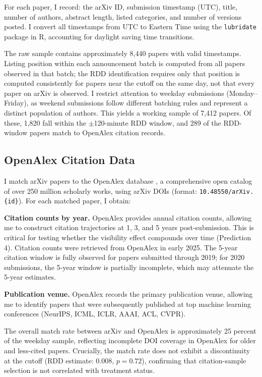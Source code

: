 \documentclass[12pt]{article}
\begin{document}
For each paper, I record: the arXiv ID, submission timestamp (UTC), title, number of authors, abstract length, listed categories, and number of versions posted. I convert all timestamps from UTC to Eastern Time using the \texttt{lubridate} package in R, accounting for daylight saving time transitions.

The raw sample contains approximately 8,440 papers with valid timestamps. Listing position within each announcement batch is computed from all papers observed in that batch; the RDD identification requires only that position is computed consistently for papers near the cutoff on the same day, not that every paper on arXiv is observed. I restrict attention to weekday submissions (Monday--Friday), as weekend submissions follow different batching rules and represent a distinct population of authors. This yields a working sample of 7,412 papers. Of these, 1,820 fall within the $\pm$120-minute RDD window, and 289 of the RDD-window papers match to OpenAlex citation records.

\subsection{OpenAlex Citation Data}

I match arXiv papers to the OpenAlex database \citep{priem2022}, a comprehensive open catalog of over 250 million scholarly works, using arXiv DOIs (format: \texttt{10.48550/arXiv.\{id\}}). For each matched paper, I obtain:

\textbf{Citation counts by year.} OpenAlex provides annual citation counts, allowing me to construct citation trajectories at 1, 3, and 5 years post-submission. This is critical for testing whether the visibility effect compounds over time (Prediction 4). Citation counts were retrieved from OpenAlex in early 2025. The 5-year citation window is fully observed for papers submitted through 2019; for 2020 submissions, the 5-year window is partially incomplete, which may attenuate the 5-year estimates.

\textbf{Publication venue.} OpenAlex records the primary publication venue, allowing me to identify papers that were subsequently published at top machine learning conferences (NeurIPS, ICML, ICLR, AAAI, ACL, CVPR).

The overall match rate between arXiv and OpenAlex is approximately 25 percent of the weekday sample, reflecting incomplete DOI coverage in OpenAlex for older and less-cited papers. Crucially, the match rate does not exhibit a discontinuity at the cutoff (RDD estimate: 0.008, $p = 0.72$), confirming that citation-sample selection is not correlated with treatment status.
\end{document}
